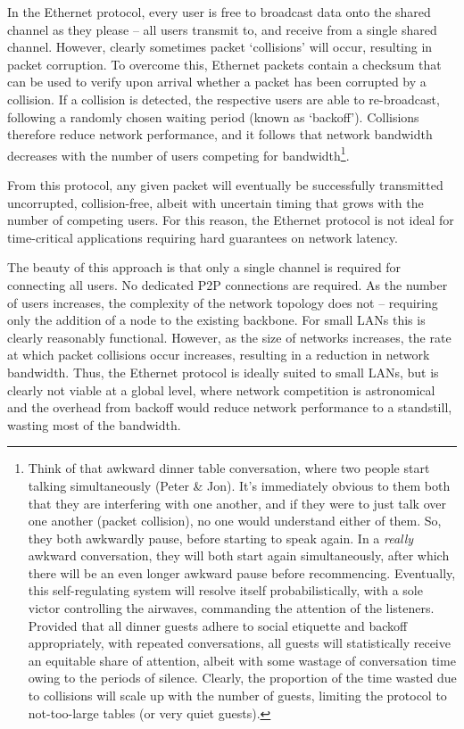 In the Ethernet protocol, every user is free to broadcast data onto the shared channel as they please -- all users transmit to, and receive from a single shared channel. However, clearly sometimes packet `collisions' will occur, resulting in packet corruption. To overcome this, Ethernet packets contain a checksum that can be used to verify upon arrival whether a packet has been corrupted by a collision. If a collision is detected, the respective users are able to re-broadcast, following a randomly chosen waiting period (known as `backoff'). Collisions therefore reduce network performance, and it follows that network bandwidth decreases with the number of users competing for bandwidth\footnote{Think of that awkward dinner table conversation, where two people start talking simultaneously (Peter \& Jon). It's immediately obvious to them both that they are interfering with one another, and if they were to just talk over one another (packet collision), no one would understand either of them. So, they both awkwardly pause, before starting to speak again. In a \textit{really} awkward conversation, they will both start again simultaneously, after which there will be an even longer awkward pause before recommencing. Eventually, this self-regulating system will resolve itself probabilistically, with a sole victor controlling the airwaves, commanding the attention of the listeners. Provided that all dinner guests adhere to social etiquette and backoff appropriately, with repeated conversations, all guests will statistically receive an equitable share of attention, albeit with some wastage of conversation time owing to the periods of silence. Clearly, the proportion of the time wasted due to collisions will scale up with the number of guests, limiting the protocol to not-too-large tables (or very quiet guests).}.

From this protocol, any given packet will eventually be successfully transmitted uncorrupted, collision-free, albeit with uncertain timing that grows with the number of competing users. For this reason, the Ethernet protocol is not ideal for time-critical applications requiring hard guarantees on network latency.

The beauty of this approach is that only a single channel is required for connecting all users. No dedicated P2P connections are required. As the number of users increases, the complexity of the network topology does not -- requiring only the addition of a node to the existing backbone. For small LANs this is clearly reasonably functional. However, as the size of networks increases, the rate at which packet collisions occur increases, resulting in a reduction in network bandwidth. Thus, the Ethernet protocol is ideally suited to small LANs, but is clearly not viable at a global level, where network competition is astronomical and the overhead from backoff would reduce network performance to a standstill, wasting most of the bandwidth.

